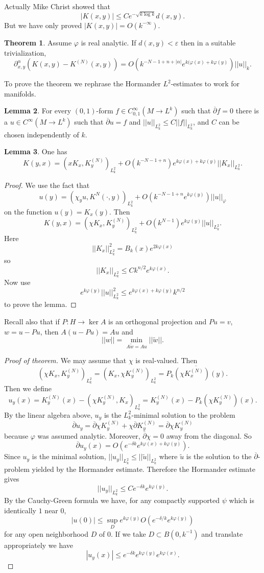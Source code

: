 \documentclass[12pt]{report}
\newcommand{\dbar}{\overline\partial}
\theoremstyle{definition}
\newtheorem{theorem}{Theorem}[chapter]
\newtheorem{lemma}[theorem]{Lemma}
\begin{document}
    Actually Mike Christ showed that
    $$|K(x, y)| \leq Ce^{-\sqrt{k \log k}}d(x, y).$$
    But we have only proved $|K(x, y)| = O(k^{-\infty})$.
\begin{theorem}
    Assume $\varphi$ is real analytic. If $d(x, y) < \varepsilon$ then in a suitable trivialization,
    $$\partial^\alpha_{x,y}(K(x, y) - K^{(N)}(x, y)) = O(k^{-N-1+n+|\alpha|}e^{k(\varphi(x)+k\varphi(y)})||u||_k.$$
\end{theorem}
    To prove the theorem we rephrase the Hormander $L^2$-estimates to work for manifolds.
\begin{lemma}
    For every $(0, 1)$-form $f \in C^\infty_{0,1}(M \to L^k)$ such that $\dbar f = 0$ there is a $u \in C^\infty(M \to L^k)$ such that $\dbar u = f$ and $||u||_{L^2_k} \leq C||f||_{L^2_k}$, and $C$ can be chosen independently of $k$.
\end{lemma}
\begin{lemma}
    One has
    $$K(y, x) = (xK_x, K_y^{(N)})_{L^2_k} + O(k^{-N-1+n})e^{k\varphi(x) + k\varphi(y)}||K_x||_{L^2_k}.$$
\end{lemma}
\begin{proof}
    We use the fact that
    $$u(y) = (\chi_yu, K^N(\cdot, y))_{L^2_k} + O(k^{-N-1+n}e^{k\varphi(y)})||u||_\varphi$$
    on the function $u(y) = K_x(y)$. Then
    $$K(y, x) = (\chi K_x, K_y^{(N)})_{L^2_k} + O(k^{N-1})e^{k\varphi(y)}||u||_{L^2_k}.$$
    Here
    $$||K_x||_{L^2_k}^2 = B_k(x)e^{2k\varphi(x)}$$
    so
    $$||K_x||_{L^2_k} \leq Ck^{n/2}e^{k\varphi(x)}.$$
    Now use
    $$e^{k\varphi(y)}||u||_{L^2_k}^2 \leq e^{k\varphi(x) + k\varphi(y)} k^{n/2}$$
    to prove the lemma.
\end{proof}
    Recall also that if $P: H \to \ker A$ is an orthogonal projection and $Pu = v$, $w = u - Pu$, then $A(u - Pu) = Au$ and
    $$||w|| = \min_{A\tilde w = Au} ||\tilde w||.$$
\begin{proof}[Proof of theorem]
    We may assume that $\chi$ is real-valued. Then
    $$(\chi K_x, K_y^{(N)})_{L^2_k} = (K_x, \chi K_y^{(N)})_{L^2_k} = \overline{P_k(\chi K_x^{(N)})(y)}.$$
    Then we define
    $$u_y(x) = K_y^{(N)}(x) - (\chi K_y^{(N)}, K_x)_{L^2_k} = K_y^{(N)}(x) - P_k(\chi K_y^{(N)})(x).$$
    By the linear algebra above, $u_y$ is the $L^2_k$-minimal solution to the problem
    $$\dbar u_y = \dbar \chi K_y^{(N)} + \chi \dbar K_y^{(N)} = \dbar \chi K_y^{(N)}$$
    because $\varphi$ was assumed analytic. Moreover, $\dbar \chi = 0$ away from the diagonal. So
    $$\dbar u_y(x) = O(e^{-\delta k}e^{k\varphi(x) + k\varphi(y)}).$$
    Since $u_y$ is the minimal solution, $||u_y||_{L^2_k} \leq ||\tilde u||_{L^2_k}$ where $\tilde u$ is the solution to the $\dbar$-problem yielded by the Hormander estimate. Therefore the Hormander estimate gives
    $$||u_y||_{L^2_k} \leq Ce^{-\delta k}e^{k\varphi(y)}.$$
    By the Cauchy-Green formula we have, for any compactly supported $\psi$ which is identically $1$ near $0$,
    $$|u(0)| \leq \sup_D e^{k\varphi(y)} O(e^{-\delta/k} e^{k\varphi(y)})$$
    for any open neighborhood $D$ of $0$. If we take $D \subset B(0, k^{-1})$ and translate appropriately we have
    $$|u_y(x)| \leq e^{-\delta k}e^{k\varphi(y)} e^{k\varphi(x)}.$$
\end{proof}
\end{document}
